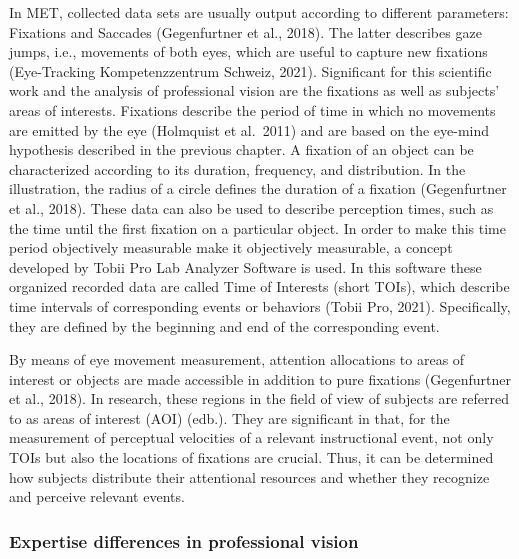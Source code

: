 \documentclass[
  man]{apa6}
\begin{document}
In MET, collected data sets are usually output according to different parameters: Fixations and Saccades (Gegenfurtner et al., 2018). The latter describes gaze jumps, i.e., movements of both eyes, which are useful to capture new fixations (Eye-Tracking Kompetenzzentrum Schweiz, 2021). Significant for this scientific work and the analysis of professional vision are the fixations as well as subjects' areas of interests. Fixations describe the period of time in which no movements are emitted by the eye (Holmquist et al.~2011) and are based on the eye-mind hypothesis described in the previous chapter. A fixation of an object can be characterized according to its duration, frequency, and distribution. In the illustration, the radius of a circle defines the duration of a fixation (Gegenfurtner et al., 2018). These data can also be used to describe perception times, such as the time until the first fixation on a particular object. In order to make this time period objectively measurable make it objectively measurable, a concept developed by Tobii Pro Lab Analyzer Software is used. In this software these organized recorded data are called Time of Interests (short TOIs), which describe time intervals of corresponding events or behaviors (Tobii Pro, 2021). Specifically, they are defined by the beginning and end of the corresponding event.

By means of eye movement measurement, attention allocations to areas of interest or objects are made accessible in addition to pure fixations (Gegenfurtner et al., 2018). In research, these regions in the field of view of subjects are referred to as areas of interest (AOI) (edb.). They are significant in that, for the measurement of perceptual velocities of a relevant instructional event, not only TOIs but also the locations of fixations are crucial. Thus, it can be determined how subjects distribute their attentional resources and whether they recognize and perceive relevant events.

\hypertarget{expertise-differences-in-professional-vision}{%
\subsubsection{Expertise differences in professional vision}\label{expertise-differences-in-professional-vision}}
\end{document}
